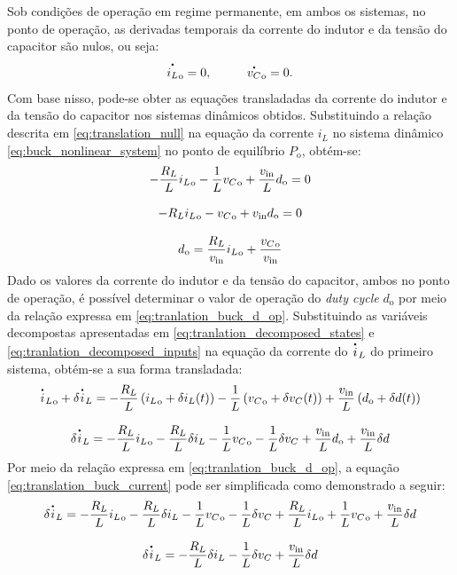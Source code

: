 Sob condições de operação em regime permanente, em ambos os sistemas, no ponto de operação, as derivadas temporais da corrente do indutor e da tensão do capacitor são nulos, ou seja: \begin{equation} \dt{i_L}_{\mathrm{o}} = 0, \hspace{1cm} \dt{v_C}_{\mathrm{o}} = 0. \label{eq:translation_null}\end{equation} Com base nisso, pode-se obter as equações transladadas da corrente do indutor e da tensão do capacitor nos sistemas dinâmicos obtidos. Substituindo a relação descrita em \eqref{eq:translation_null} na equação da corrente $i_L$ no sistema dinâmico \eqref{eq:buck_nonlinear_system} no ponto de equilíbrio $P_{\mathrm{o}}$, obtém-se: \begin{gather}
  - \frac{R_L}{L} {i_L}_{\mathrm{o}} - \frac{1}{L} {v_C}_{\mathrm{o}} + \frac{v_{\mathrm{in}}}{L}  d_{\mathrm{o}} = 0  \notag \\[8pt]
  - R_L {i_L}_{\mathrm{o}} - {v_C}_{\mathrm{o}} + v_{\mathrm{in}}  d_{\mathrm{o}} = 0 \notag \\[8pt]
  d_{\mathrm{o}} = \frac{R_L}{v_{\mathrm{in}}} {i_L}_{\mathrm{o}} + \frac{{v_C}_{\mathrm{o}}}{v_{\mathrm{in}}} \label{eq:tranlation_buck_d_op}
\end{gather} Dado os valores da corrente do indutor e da tensão do capacitor, ambos no ponto de operação, é possível determinar o valor de operação do \textit{duty cycle }$d_{\mathrm{o}}$ por meio da relação expressa em \eqref{eq:tranlation_buck_d_op}. Substituindo as variáveis decompostas apresentadas em \eqref{eq:tranlation_decomposed_states} e \eqref{eq:tranlation_decomposed_inputs} na equação da corrente do $\dt{i}_L$ do primeiro sistema, obtém-se a sua forma transladada: \begin{gather}
  {\dt{i}_L}_{\mathrm{o}} + \delta \dt{i}_L = - \frac{R_L}{L} \left({i_L}_{\mathrm{o}} + \delta i_L(t)\right) - \frac{1}{L} \left({v_C}_{\mathrm{o}} + \delta v_C(t)\right) + \frac{v_{\mathrm{in}}}{L} \left(d_{\mathrm{o}} + \delta d(t)\right) \notag\\[8pt]
  \delta \dt{i}_L = - \frac{R_L}{L} {i_L}_{\mathrm{o}} - \frac{R_L}{L} \delta i_L - \frac{1}{L} {v_C}_{\mathrm{o}} - \frac{1}{L} \delta v_C + \frac{v_{\mathrm{in}}}{L} d_{\mathrm{o}} + \frac{v_{\mathrm{in}}}{L} \delta d \label{eq:translation_buck_current}
\end{gather} Por meio da relação expressa em \eqref{eq:tranlation_buck_d_op}, a equação \eqref{eq:translation_buck_current} pode ser simplificada como demonstrado a seguir: \begin{gather}
  \delta \dt{i}_L = - \frac{R_L}{L} {i_L}_{\mathrm{o}} - \frac{R_L}{L} \delta i_L - \frac{1}{L} {v_C}_{\mathrm{o}} - \frac{1}{L} \delta v_C +  \frac{R_L}{L} {i_L}_{\mathrm{o}} + \frac{1}{L} {v_C}_{\mathrm{o}} + \frac{v_{\mathrm{in}}}{L} \delta d \notag \\[8pt]
  \delta \dt{i}_L = - \frac{R_L}{L} \delta i_L - \frac{1}{L} \delta v_C  + \frac{v_{\mathrm{in}}}{L} \delta d \label{eq:translation_buck_current_simplified}
\end{gather}

